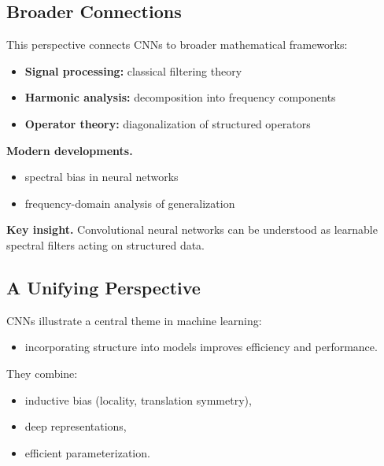 \subsection{Broader Connections}

This perspective connects CNNs to broader mathematical frameworks:

\begin{itemize}
    \item \textbf{Signal processing:} classical filtering theory
    \item \textbf{Harmonic analysis:} decomposition into frequency components
    \item \textbf{Operator theory:} diagonalization of structured operators
\end{itemize}

\medskip

\noindent
\textbf{Modern developments.}

\begin{itemize}
    \item spectral bias in neural networks
    \item frequency-domain analysis of generalization
\end{itemize}

\medskip

\noindent
\textbf{Key insight.}  
Convolutional neural networks can be understood as learnable spectral filters acting on structured data.

\subsection{A Unifying Perspective}

CNNs illustrate a central theme in machine learning:

\begin{itemize}
    \item incorporating structure into models improves efficiency and performance.
\end{itemize}

\medskip

\noindent
They combine:

\begin{itemize}
    \item inductive bias (locality, translation symmetry),
    \item deep representations,
    \item efficient parameterization.
\end{itemize}

